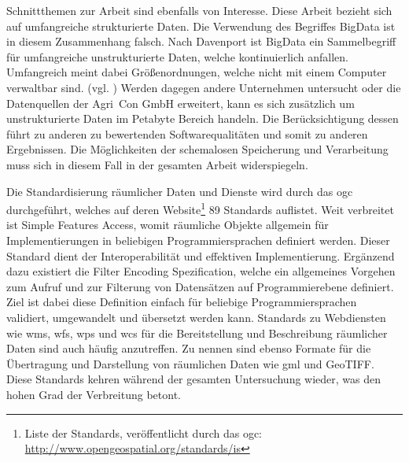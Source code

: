 Schnittthemen zur Arbeit sind ebenfalls von Interesse.
Diese Arbeit bezieht sich auf umfangreiche strukturierte Daten.
Die Verwendung des Begriffes BigData ist in diesem Zusammenhang falsch.
Nach Davenport ist BigData ein Sammelbegriff für umfangreiche unstrukturierte Daten, welche kontinuierlich anfallen.
Umfangreich meint dabei Größenordnungen, welche nicht mit einem Computer verwaltbar sind. (vgl. \cite[S.1]{book:bigdata})
Werden dagegen andere Unternehmen untersucht oder die Datenquellen der Agri~Con GmbH erweitert, kann es sich zusätzlich um unstrukturierte Daten im Petabyte Bereich handeln.
Die Berücksichtigung dessen führt zu anderen zu bewertenden Softwarequalitäten und somit zu anderen Ergebnissen.
Die Möglichkeiten der schemalosen Speicherung und Verarbeitung muss sich in diesem Fall in der gesamten Arbeit widerspiegeln.

Die Standardisierung räumlicher Daten und Dienste wird durch das \Gls{ogc} durchgeführt, welches auf deren Website\footnote{Liste der Standards, veröffentlicht durch das \Gls{ogc}: \url{http://www.opengeospatial.org/standards/is}} 89 Standards auflistet.
Weit verbreitet ist Simple Features Access, womit räumliche Objekte allgemein für Implementierungen in beliebigen Programmiersprachen definiert werden.
Dieser Standard dient der Interoperabilität und effektiven Implementierung.
Ergänzend dazu existiert die Filter Encoding Spezification, welche ein allgemeines Vorgehen zum Aufruf und zur Filterung von Datensätzen auf Programmierebene definiert.
Ziel ist dabei diese Definition einfach für beliebige Programmiersprachen validiert, umgewandelt und übersetzt werden kann.
Standards zu Webdiensten wie \Gls{wms}, \Gls{wfs}, \Gls{wps} und \Gls{wcs} für die Bereitstellung und Beschreibung räumlicher Daten sind auch häufig anzutreffen.
Zu nennen sind ebenso Formate für die Übertragung und Darstellung von räumlichen Daten wie \Gls{gml} und GeoTIFF.
Diese Standards kehren während der gesamten Untersuchung wieder, was den hohen Grad der Verbreitung betont.

